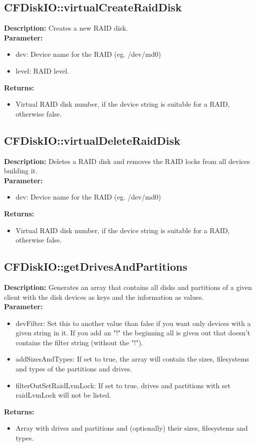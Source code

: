 \subsection{CFDiskIO::virtualCreateRaidDisk}
\textbf{Description:} Creates a new RAID disk.\\
\textbf{Parameter:}
\begin{itemize}
\item dev: Device name for the RAID (eg. /dev/md0)
\item level: RAID level.
\end{itemize}
\textbf{Returns:}
\begin{itemize}
\item Virtual RAID disk number, if the device string is suitable for a RAID, otherwise false.
\end{itemize}

\subsection{CFDiskIO::virtualDeleteRaidDisk}
\textbf{Description:} Deletes a RAID disk and removes the RAID locks from all devices building it.\\
\textbf{Parameter:}
\begin{itemize}
\item dev: Device name for the RAID (eg. /dev/md0)
\end{itemize}
\textbf{Returns:}
\begin{itemize}
\item Virtual RAID disk number, if the device string is suitable for a RAID, otherwise false.
\end{itemize}

\subsection{CFDiskIO::getDrivesAndPartitions}
\textbf{Description:} Generates an array that contains all disks and partitions of a given client with the disk devices as keys and the information as values.\\
\textbf{Parameter:}
\begin{itemize}
\item devFilter: Set this to another value than false if you want only devices with a given string in it. If you add an "!" the beginning all is given out that doesn't contains the filter string (without the "!").
\item addSizesAndTypes: If set to true, the array will contain the sizes, filesystems and types of the partitions and drives.
\item filterOutSetRaidLvmLock: If set to true, drives and partitions with set raidLvmLock will not be listed.
\end{itemize}
\textbf{Returns:}
\begin{itemize}
\item Array with drives and partitions and (optionally) their sizes, filesystems and types.
\end{itemize}

